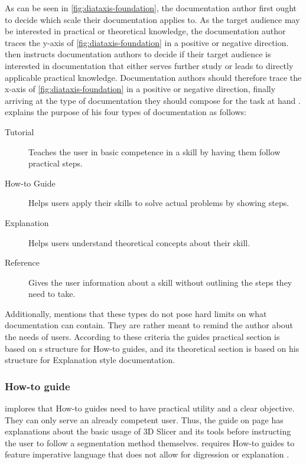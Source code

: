 \noindent
As can be seen in \cref{fig:diataxis-foundation}, the documentation author first ought to decide which scale their documentation applies to.
As the target audience may be interested in practical or theoretical knowledge, the documentation author traces the y-axis of \cref{fig:diataxis-foundation} in a positive or negative direction.
\citeauthor{procidaDiataxisDocumentationFramework2023} then instructs documentation authors to decide if their target audience is interested in documentation that either serves further study or leads to directly applicable practical knowledge.
Documentation authors should therefore trace the x-axis of \cref{fig:diataxis-foundation} in a positive or negative direction, finally arriving at the type of documentation they should compose for the task at hand \cite{procidaPythonDocsCommunity2022}.
\citeauthor{procidaDiataxisDocumentationFramework2023} explains the purpose of his four types of documentation as follows:
\begin{description}
	\item[Tutorial] Teaches the user in basic competence in a skill by having them follow practical steps.
	\item[How-to Guide] Helps users apply their skills to solve actual problems by showing steps.
	\item[Explanation] Helps users understand theoretical concepts about their skill.
	\item[Reference] Gives the user information about a skill without outlining the steps they need to take.
\end{description}
Additionally, \citeauthor{procidaDiataxisDocumentationFramework2023} mentions that these types do not pose hard limits on what documentation can contain. They are rather meant to remind the author about the needs of users.
According to these criteria the guides practical section is based on \citeauthor{procidaDiataxisDocumentationFramework2023}s structure for How-to guides, and its theoretical section is based on his structure for Explanation style documentation.

\subsubsection*{How-to guide}
\citeauthor{procidaDiataxisDocumentationFramework2023} implores that How-to guides need to have practical utility and a clear objective.
They can only serve an already competent user.
Thus, the guide on page \pageref{a:guide} has explanations about the basic usage of 3D Slicer and its tools before instructing the user to follow a segmentation method themselves.
\citeauthor{procidaDiataxisDocumentationFramework2023} requires How-to guides to feature imperative language that does not allow for digression or explanation \cite{procidaPythonDocsCommunity2022,procidaDiataxisDocumentationFramework2023}.

